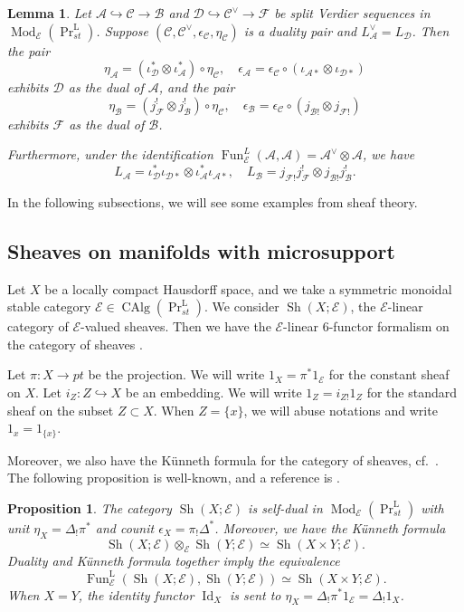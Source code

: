 \documentclass[11pt]{amsart}
\numberwithin{equation}{section}
\theoremstyle{plain}
\newtheorem{Prop}[prop]{Proposition}
\newtheorem{Lemma}[lemma]{Lemma}
\theoremstyle{definition}
\theoremstyle{remark}
\newcommand{\cA} { {\mathcal{A}}}
\newcommand{\cB} { {\mathcal{B}}}
\newcommand{\cC} { {\mathcal{C}}}
\newcommand{\cD} { {\mathcal{D}}}
\newcommand{\cE} { {\mathcal{E}}}
\newcommand{\Id}{{\operatorname{Id}}}
\newcommand{\Mod}{{\operatorname{Mod}}}
\newcommand{\Sh} { {\operatorname{Sh}}}
\newcommand\Fun{\operatorname{Fun}}
\newcommand\CAlg{ {\operatorname{CAlg}} }
\newcommand\PrLst{  {  \operatorname{Pr}^{\operatorname{L} }_{st} } }
\begin{document}
\begin{Lemma}\label{lem: duality admissible category}
Let $\cA \hookrightarrow \cC \rightarrow \cB$ and $\cD \hookrightarrow \cC^\vee \rightarrow \mathcal{F}$ be split Verdier sequences in $\Mod_\cE(\PrLst)$. Suppose $(\cC, \cC^\vee, \epsilon_\cC, \eta_\cC)$ is a duality pair and $L_\cA^\vee = L_\cD$. Then the pair
\[\eta_\cA = (\iota_{\cD}^* \otimes \iota_{\cA}^*) \circ \eta_\cC, \quad \epsilon_\cA = \epsilon_\cC \circ (\iota_{\cA*} \otimes \iota_{\cD*})\]
exhibits $\cD$ as the dual of $\cA$, and the pair
\[
\eta_\cB = (j_{\mathcal{F}}^! \otimes j_{\cB}^!) \circ \eta_\cC, \quad \epsilon_\cB = \epsilon_\cC \circ (j_{\cB!} \otimes j_{\mathcal{F}!})
\]
exhibits $\mathcal{F}$ as the dual of $\cB$. 

Furthermore, under the identification $\Fun_\cE^L(\cA, \cA) = \cA^\vee \otimes \cA$, we have
\[L_\cA = \iota_\cD^*\iota_{\cD*} \otimes \iota_\cA^*\iota_{\cA*}, \quad L_\cB = j_{\mathcal{F}!}j_{\mathcal{F}}^! \otimes j_{\cB!}j_\cB^!.\]
\end{Lemma}

In the following subsections, we will see some examples from sheaf theory.


\subsection{Sheaves on manifolds with microsupport}
Let $X$ be a locally compact Hausdorff space, and we take a symmetric monoidal stable category $\cE\in \CAlg(\PrLst)$. We consider $\Sh(X;\cE)$, the $\cE$-linear category of $\cE$-valued sheaves. Then we have the $\cE$-linear 6-functor formalism on the category of sheaves \cite{6functor-infinity}. 

Let $\pi: X \to pt$ be the projection. We will write $1_X = \pi^*1_\cE$ for the constant sheaf on $X$. Let $i_Z: Z \hookrightarrow X$ be an embedding. We will write $1_Z = i_{Z!}1_Z$ for the standard sheaf on the subset $Z \subset X$. When $Z = \{x\}$, we will abuse notations and write $1_x = 1_{\{x\}}$.

Moreover, we also have the K\"unneth formula for the category of sheaves, cf.~\cite[Proposition~2.30]{6functor-infinity}. The following proposition is well-known, and a reference is {\cite[Proposition 3.1 \& 3.2]{Hochschild-Kuo-Shende-Zhang}}.

\begin{Prop}\label{prop: Künneth formula of sheaves}
The category $\Sh(X;\cE)$ is self-dual in $\Mod_{\cE}(\PrLst)$ with unit $\eta_X = \Delta_!\pi^*$ and counit $\epsilon_X = \pi_!\Delta^*$. Moreover, we have the K\"unneth formula
\[\Sh(X; \cE) \otimes_\cE \Sh(Y; \cE) \simeq \Sh(X\times Y;\cE).\]
Duality and K\"unneth formula together imply the equivalence
\[\Fun^\mathrm{L}_\cE(\Sh(X;\cE),\Sh(Y;\cE)) \simeq \Sh(X\times Y;\cE).\]
When $X = Y$, the identity functor $\Id_X$ is sent to $\eta_X = \Delta_!\pi^*1_\cE = \Delta_!1_{X}$.
\end{Prop}
\end{document}
